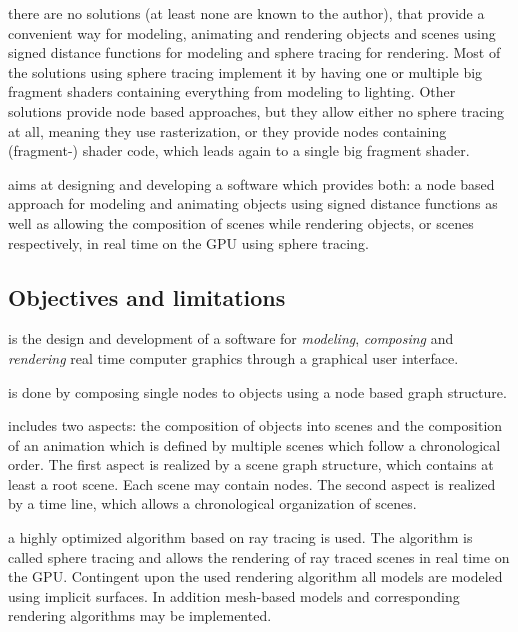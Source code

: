 \documentclass[%
    a4paper,
    nobib,   %
    openany  %
]{tufte-book}
\begin{document}
 there are no solutions (at least none are
known to the author), that provide a convenient way for modeling, animating and
rendering objects and scenes using signed distance functions for modeling and
sphere tracing for rendering.
Most of the solutions using sphere tracing implement it by having one or
multiple big fragment shaders containing everything from modeling to lighting.
Other solutions provide node based approaches, but they allow either no sphere
tracing at all, meaning they use rasterization, or they provide nodes containing
(fragment-) shader code, which leads again to a single big fragment shader.

 aims at designing and developing a software which
provides both: a node based approach for modeling and animating objects using
signed distance functions as well as allowing the composition of scenes while
rendering objects, or scenes respectively, in real time on the GPU using sphere
tracing.

\subsection{Objectives and limitations}
\label{subsec:objectives}

 is the design and development of a
software for \textit{modeling}, \textit{composing} and \textit{rendering} real
time computer graphics through a graphical user interface.

 is done by composing single nodes to objects using a
node based graph structure.

 includes two aspects: the composition of objects into
scenes and the composition of an animation which is defined by multiple scenes
which follow a chronological order. The first aspect is realized by a scene
graph structure, which contains at least a root scene. Each scene may contain
nodes. The second aspect is realized by a time line, which allows a
chronological organization of scenes.

 a highly optimized algorithm based on ray tracing is
used. The algorithm is called sphere tracing and allows the rendering of ray
traced scenes in real time on the GPU. Contingent upon the used rendering
algorithm all models are modeled using implicit surfaces. In addition
mesh-based models and corresponding rendering algorithms may be implemented.
\end{document}
